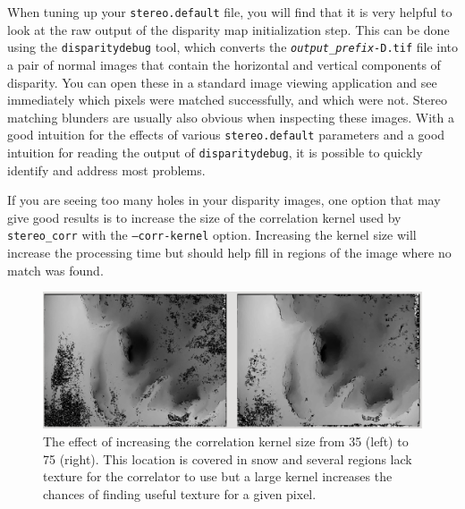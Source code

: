 When tuning up your {\tt stereo.default} file, you will find that
it is very helpful to look at the raw output of the disparity map
initialization step.  This can be done using the {\tt disparitydebug}
tool, which converts the \texttt{\textit{output\_prefix}-D.tif}
file into a pair of normal images that contain the horizontal and
vertical components of disparity.  You can open these in a standard
image viewing application and see immediately which pixels were
matched successfully, and which were not. Stereo matching blunders
are usually also obvious when inspecting these images.  With a good
intuition for the effects of various {\tt stereo.default} parameters
and a good intuition for reading the output of {\tt disparitydebug},
it is possible to quickly identify and address most problems.

If you are seeing too many holes in your disparity images, one option 
that may give good results is to increase the size of the
correlation kernel used by \texttt{stereo\_corr} with the 
\texttt{--corr-kernel} option.  Increasing the kernel size will 
increase the processing time but should help fill in regions of
the image where no match was found.  

\begin{figure}[tb]
  \centering
  \includegraphics[width=17cm]{images/correlation/stereo_corr_box_compare.png}
  \caption{The effect of increasing the correlation kernel size from 35 (left) 
  to 75 (right). This location is covered in snow and several regions lack 
  texture for the correlator to use but a large kernel increases the chances 
  of finding useful texture for a given pixel.}
  \label{fig:corr-kernel-size-effect}
\end{figure}


